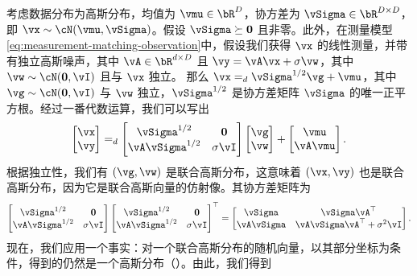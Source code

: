 \documentclass[../../book-main.tex]{subfiles}
\begin{document}
\begin{example}\label{example:denoising-conditional-gaussian}
  考虑数据分布为高斯分布，均值为 $\vmu \in \bR^D$，协方差为 $\vSigma \in \bR^{D \times D}$，即 $\vx \sim \cN(\vmu, \vSigma)$。假设 $\vSigma \succeq \Zero$ 且非零。此外，在测量模型\eqref{eq:measurement-matching-observation}中，假设我们获得 $\vx$ 的线性测量，并带有独立高斯噪声，其中 $\vA \in \bR^{d \times D}$ 且 $\vy = \vA \vx + \sigma \vw$，其中 $\vw \sim \cN(\Zero, \vI)$ 且与 $\vx$ 独立。
  那么 $\vx =_{d} \vSigma^{1/2} \vg + \vmu$，其中 $\vg \sim \cN(\Zero, \vI)$ 与 $\vw$ 独立，$\vSigma^{1/2}$ 是协方差矩阵 $\vSigma$ 的唯一正平方根。经过一番代数运算，我们可以写出
  \begin{equation*}
    \begin{bmatrix}
      \vx \\
      \vy
    \end{bmatrix}
    =_{d}
    \begin{bmatrix}
      \vSigma^{1/2} & \Zero \\
      \vA \vSigma^{1/2} & \sigma \vI
    \end{bmatrix}
    \begin{bmatrix}
      \vg \\
      \vw
    \end{bmatrix}
    +
    \begin{bmatrix}
      \vmu \\
      \vA\vmu
    \end{bmatrix}.
  \end{equation*}
  根据独立性，我们有 $(\vg, \vw)$ 是联合高斯分布，这意味着 $(\vx, \vy)$ 也是联合高斯分布，因为它是联合高斯向量的仿射像。其协方差矩阵为
  \begin{equation*}
    \begin{bmatrix}
      \vSigma^{1/2} & \Zero \\
      \vA \vSigma^{1/2} & \sigma \vI
    \end{bmatrix}
    \begin{bmatrix}
      \vSigma^{1/2} & \Zero \\
      \vA \vSigma^{1/2} & \sigma \vI
    \end{bmatrix}^\top
    =
    \begin{bmatrix}
      \vSigma & \vSigma \vA^\top \\
      \vA \vSigma & \vA \vSigma \vA^\top + \sigma^2 \vI
    \end{bmatrix}.
  \end{equation*}
  现在，我们应用一个事实：对一个联合高斯分布的随机向量，以其部分坐标为条件，得到的仍然是一个高斯分布（）。由此，我们得到

\end{example}
\end{document}
